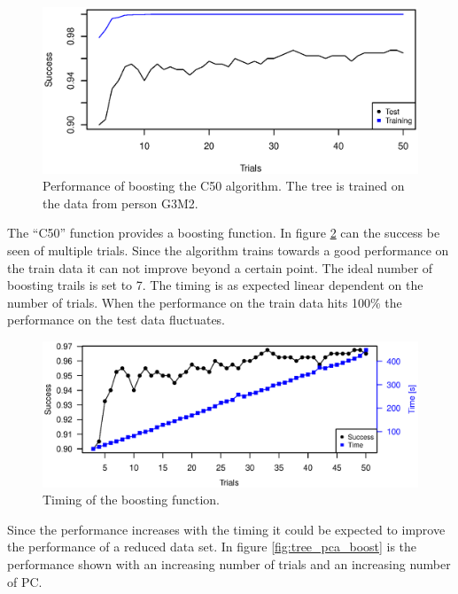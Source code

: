 \begin{figure}[H]
\includegraphics[width = \textwidth]{graphics/tree_boost_overfitting}
\caption[Success for decision tree with boosting.]{Performance of boosting the C50 algorithm. 
The tree is trained on the data from person G3M2. }
\label{fig:tree_overfitting}
\end{figure}

The ``C50'' function provides a boosting function.
In figure \ref{fig:tree_timing} can the success be seen of multiple trials.
Since the algorithm trains towards a good performance on the train data it can not improve beyond a certain point.
The ideal number of boosting trails is set to 7.
The timing is as expected linear dependent on the number of trials.
When the performance on the train data hits 100\% the performance on the test data fluctuates. 

\begin{figure}[H]
\includegraphics[width = \textwidth]{graphics/tree_timing_one}
\caption[Timing for decision tree with boosting.]{Timing of the boosting function.}
\label{fig:tree_timing}
\end{figure}

Since the performance increases with the timing it could be expected to improve the performance of a reduced data set.
In figure \ref{fig:tree_pca_boost} is the performance shown with an increasing number of trials and an increasing number of PC.

